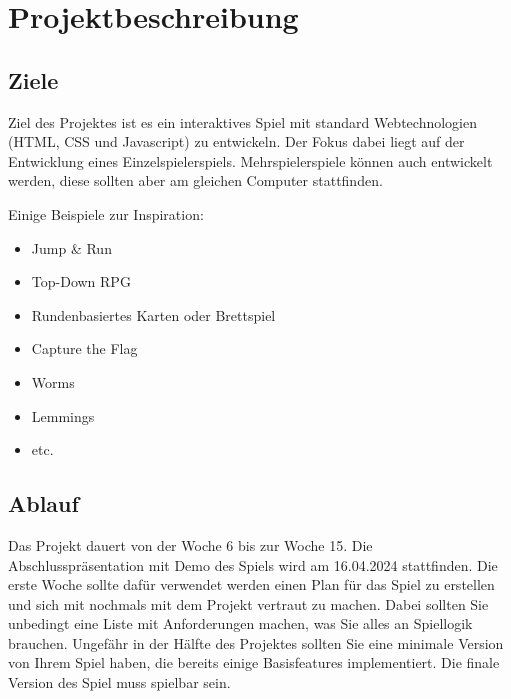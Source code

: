 \documentclass[11pt,a4paper]{report}
\begin{document}




\newpage

\section{Projektbeschreibung}

\subsection{Ziele} 

Ziel des Projektes ist es ein interaktives Spiel mit standard Webtechnologien
(HTML, CSS und Javascript) zu entwickeln. Der Fokus dabei liegt auf der
Entwicklung eines Einzelspielerspiels. Mehrspielerspiele können auch entwickelt
werden, diese sollten aber am gleichen Computer stattfinden.

Einige Beispiele zur Inspiration:
\begin{itemize}
\item Jump \& Run
\item Top-Down RPG
\item Rundenbasiertes Karten oder Brettspiel
\item Capture the Flag
\item Worms
\item Lemmings
\item etc.
\end{itemize}

\subsection{Ablauf}
Das Projekt dauert von der Woche 6 bis zur Woche 15. Die Abschlusspräsentation
mit Demo des Spiels wird am 16.04.2024 stattfinden. Die erste Woche sollte dafür
verwendet werden einen Plan für das Spiel zu erstellen und sich mit
nochmals mit dem Projekt vertraut zu machen. Dabei sollten Sie unbedingt eine
Liste mit Anforderungen machen, was Sie alles an Spiellogik brauchen. Ungefähr
in der Hälfte des Projektes sollten Sie eine minimale Version von Ihrem Spiel
haben, die bereits einige Basisfeatures implementiert. Die finale Version des
Spiel muss spielbar sein.
\end{document}
